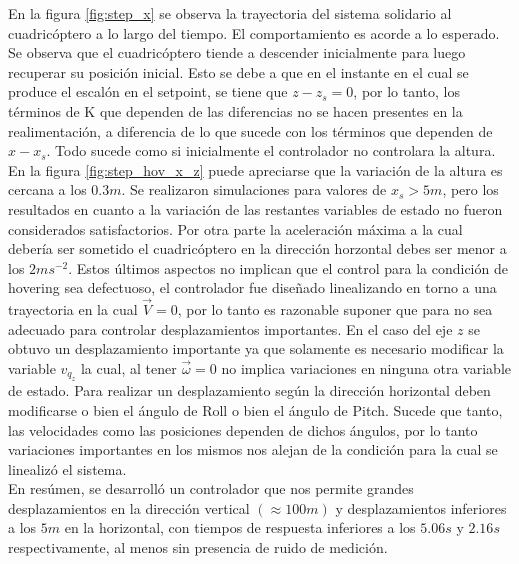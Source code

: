 \documentclass[main]{subfiles}
\begin{document}
En la figura \ref{fig:step_x} se observa la trayectoria del sistema solidario al cuadric\'optero a lo largo del tiempo. El comportamiento es acorde a lo esperado. Se observa que el cuadric\'optero tiende a descender inicialmente para luego recuperar su posici\'on inicial. Esto se debe a que en el instante en el cual se produce el escal\'on en el setpoint, se tiene que $z-z_s = 0$, por lo tanto, los t\'erminos de K que dependen de las diferencias no se hacen presentes en la realimentaci\'on, a diferencia de lo que sucede con los t\'erminos que dependen de $x-x_s$.  Todo sucede como si inicialmente el controlador no controlara la altura. En la figura \ref{fig:step_hov_x_z} puede apreciarse que la variaci\'on de la altura es cercana a los $0.3 m$. Se realizaron simulaciones para valores de $x_s > 5 m$, pero los resultados en cuanto a la variaci\'on de las restantes variables de estado no fueron considerados satisfactorios. Por otra parte la aceleraci\'on m\'axima a la cual deber\'ia ser sometido el cuadric\'optero en la direcci\'on horzontal debes ser menor a los $2 ms^{-2}$. Estos \'ultimos aspectos no implican que el control para la condici\'on de hovering sea defectuoso, el controlador fue diseñado linealizando en torno a una trayectoria en la cual $\vec{V} = 0$, por lo tanto es razonable suponer que para no sea adecuado para controlar desplazamientos importantes. En el caso del eje $z$ se obtuvo un desplazamiento importante ya que solamente es necesario modificar la variable $v_{q_z}$ la cual, al tener $\vec{\omega} = 0$ no implica variaciones en ninguna otra variable de estado. Para realizar un desplazamiento seg\'un la direcci\'on horizontal deben modificarse o bien el \'angulo de Roll o bien el \'angulo de Pitch. Sucede que tanto, las velocidades como las posiciones dependen de dichos \'angulos, por lo tanto variaciones importantes en los mismos nos alejan de la condici\'on para la cual se linealiz\'o el sistema.\\

En res\'umen, se desarroll\'o un controlador que nos permite grandes desplazamientos en la direcci\'on vertical $(\approx 100m )$ y desplazamientos inferiores a los $5 m$ en la horizontal, con tiempos de respuesta inferiores a los $5.06 s$ y $2.16 s $ respectivamente, al menos sin presencia de ruido de medici\'on.  
\end{document}
